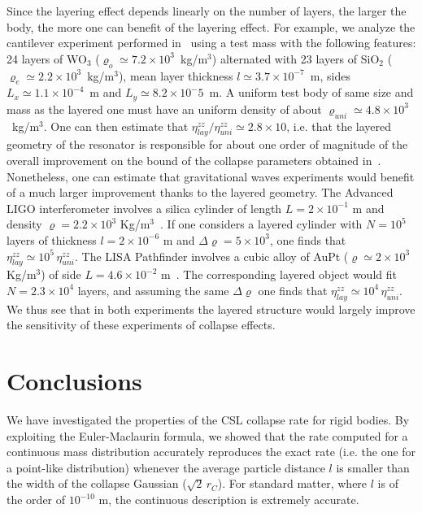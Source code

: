 \documentclass[11pt,onecolumn,amssymb,nofootinbib]{revtex4}
\begin{document}
Since the layering effect depends linearly on the number of layers, the larger the body, the more one can benefit of the layering effect. For example, we analyze the cantilever experiment performed in~\cite{lay-exp} using a test mass with the following features: 24 layers of WO$_3$ ($\varrho_o\simeq7.2\times10^3$~kg/m$^3$) alternated with 23 layers of SiO$_2$ ($\varrho_e\simeq2.2\times10^3$~kg/m$^3$), mean layer thickness $l\simeq3.7 \times 10^{-7}$~m, sides $L_x\simeq1.1\times10^{-4}$~m and $L_y\simeq8.2\times10^-5$~m. %
A uniform test body of same size and mass as the layered one must have an uniform density of about $\varrho_{uni}\simeq4.8\times10^3$~kg/m$^3$. One can then estimate that $\eta^{zz}_{lay}/\eta^{zz}_{uni}\simeq2.8\times10$, i.e. that the layered geometry of the resonator is responsible for about one order of magnitude of the overall improvement on the bound of the collapse parameters obtained in~\cite{lay-exp}. Nonetheless, one can estimate that gravitational waves experiments would benefit of a much larger improvement thanks to the layered geometry. The Advanced LIGO interferometer involves a silica cylinder of length $L=2\times 10^{-1}$ m and density $\varrho=2.2\times10^3$ Kg/m$^3$~\cite{LIGO}. If one considers a layered cylinder with $N=10^5$ layers of thickness $l=2\times 10^{-6}$ m and  $\Delta\varrho=5\times10^3$, one finds that $\eta^{zz}_{lay}\simeq10^5\,\eta^{zz}_{uni}$. The LISA Pathfinder involves a cubic alloy of AuPt ($\varrho\simeq2\times10^3$ Kg/m$^3$) of side $L=4.6\times 10^{-2}$ m~\cite{LISA}. The corresponding layered object would fit $N=2.3\times 10^{4}$ layers, and assuming the same $\Delta\varrho$ one finds that $\eta^{zz}_{lay}\simeq10^4\,\eta^{zz}_{uni}$. We thus see that in both experiments the layered structure would largely improve the sensitivity of these experiments of collapse effects.



\section{Conclusions}
We have investigated the properties of the CSL collapse rate for rigid bodies. By exploiting the Euler-Maclaurin formula, we showed that the rate computed for a continuous mass distribution accurately reproduces the exact rate (i.e. the one for a point-like distribution) whenever the average particle distance $l$ is smaller than the width of the collapse Gaussian ($\sqrt{2}\,r_C$). For standard matter, where $l$ is of the order of $10^{-10}$ m, the continuous description is extremely accurate. 
\end{document}
